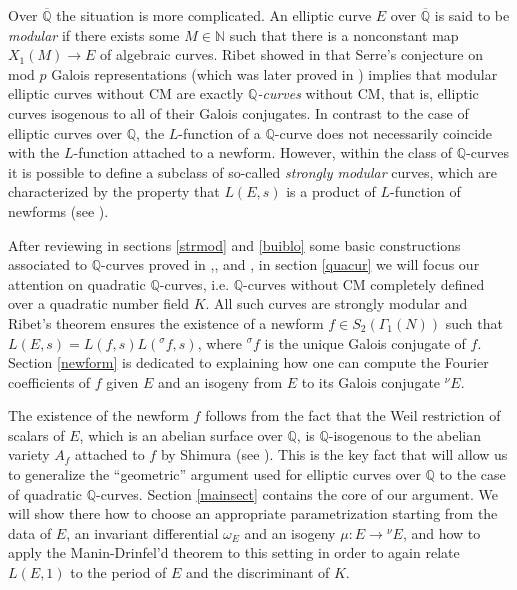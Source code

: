 \documentclass[11pt]{amsart}
\theoremstyle{definition}
\begin{document}
	Over ${\overline{\mathbb{Q}}}$ the situation is more complicated. An elliptic curve $E$ over ${\overline{\mathbb{Q}}}$ is said to be \emph{modular} if there exists some $M\in {\mathbb{N}}$ such that there is a nonconstant map $X_1(M)\to E$ of algebraic curves. Ribet showed in \cite{rib1} that Serre's conjecture on mod $p$ Galois representations (which was later proved in \cite{kwin}) implies that modular elliptic curves without CM are exactly \emph{${\mathbb{Q}}$-curves} without CM, that is, elliptic curves isogenous to all of their Galois conjugates. In contrast to the case of elliptic curves over ${\mathbb{Q}}$, the $L$-function of a ${\mathbb{Q}}$-curve does not necessarily coincide with the $L$-function attached to a newform. However, within the class of ${\mathbb{Q}}$-curves it is possible to define a subclass of so-called \emph{strongly modular} curves, which are characterized by the property that $L(E,s)$ is a product of $L$-function of newforms (see \cite{guique}).

	After reviewing in sections \ref{strmod} and \ref{buiblo} some basic constructions associated to ${\mathbb{Q}}$-curves proved in \cite{que},\cite{gola}, \cite{rib1} and \cite{guique}, in section \ref{quacur} we will focus our attention on quadratic ${\mathbb{Q}}$-curves, i.e. ${\mathbb{Q}}$-curves without CM completely defined over a quadratic number field $K$. All such curves are strongly modular and Ribet's theorem ensures the existence of a newform $f\in S_2(\Gamma_1(N))$ such that $L(E,s)=L(f,s)L({{}^\sigma\!} f,s)$, where ${{}^\sigma\!} f$ is the unique Galois conjugate of $f$. Section \ref{newform} is dedicated to explaining how one can compute the Fourier coefficients of $f$ given $E$ and an isogeny from $E$ to its Galois conjugate ${{}^\nu\!} E$.

	The existence of the newform $f$ follows from the fact that the Weil restriction of scalars of $E$, which is an abelian surface over ${\mathbb{Q}}$, is ${\mathbb{Q}}$-isogenous to the abelian variety $A_f$ attached to $f$ by Shimura (see \cite{shi}). This is the key fact that will allow us to generalize the ``geometric'' argument used for elliptic curves over ${\mathbb{Q}}$ to the case of quadratic ${\mathbb{Q}}$-curves. Section \ref{mainsect} contains the core of our argument. We will show there how to choose an appropriate parametrization starting from the data of $E$, an invariant differential $\omega_E$ and an isogeny $\mu\colon E\to {{}^\nu\!} E$, and how to apply the Manin-Drinfel'd theorem to this setting in order to again relate $L(E,1)$ to the period of $E$ and the discriminant of $K$.
\end{document}
